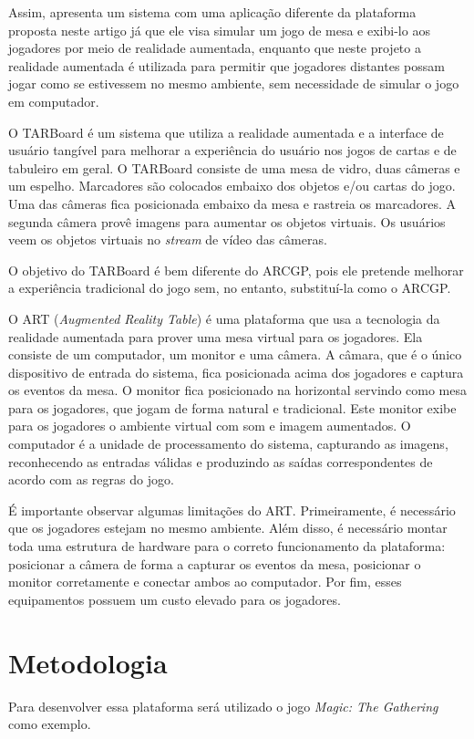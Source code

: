 \documentclass[conference]{IEEEtran}
\begin{document}
Assim, \cite{Szalavari:1998:CGA:293701.293740} apresenta um sistema com uma 
aplicação diferente da plataforma proposta neste artigo já que ele visa simular 
um jogo de mesa e exibi-lo aos jogadores por meio de realidade aumentada, 
enquanto que neste projeto a realidade aumentada é utilizada para permitir que 
jogadores distantes possam jogar como se estivessem no mesmo ambiente, sem 
necessidade de simular o jogo em computador.

O TARBoard \cite{lee2005tarboard} é um sistema que utiliza a realidade aumentada 
e a interface de usuário tangível para melhorar a experiência do usuário nos 
jogos de cartas e de tabuleiro em geral. O TARBoard consiste de uma mesa de 
vidro, duas câmeras e um espelho. Marcadores são colocados embaixo dos objetos 
e/ou cartas do jogo. Uma das câmeras fica posicionada embaixo da mesa e rastreia 
os marcadores. A segunda câmera provê imagens para aumentar os objetos virtuais. 
Os usuários veem os objetos virtuais no \textit{stream} de vídeo das câmeras.

O objetivo do TARBoard é bem diferente do ARCGP, pois ele pretende melhorar a 
experiência tradicional do jogo sem, no entanto, substituí-la como o ARCGP.

O ART (\textit{Augmented Reality Table}) \cite{Lam:2006:AAR:1128923.1128987} é 
uma plataforma que usa a tecnologia da realidade aumentada para prover uma mesa 
virtual para os jogadores. Ela consiste de um computador, um monitor e uma 
câmera. A câmara, que é o único dispositivo de entrada do sistema, fica 
posicionada acima dos jogadores e captura os eventos da mesa. O monitor fica 
posicionado na horizontal servindo como mesa para os jogadores, que jogam de 
forma natural e tradicional. Este monitor exibe para os jogadores o ambiente 
virtual com som e imagem aumentados. O computador é a unidade de processamento 
do sistema, capturando as imagens, reconhecendo as entradas válidas e produzindo 
as saídas correspondentes de acordo com as regras do jogo.

É importante observar algumas limitações do ART. Primeiramente, é necessário 
que os jogadores estejam no mesmo ambiente. Além disso, é necessário montar 
toda uma estrutura de hardware para o correto funcionamento da plataforma: 
posicionar a câmera de forma a capturar os eventos da mesa, posicionar o monitor 
corretamente e conectar ambos ao computador. Por fim, esses equipamentos 
possuem um custo elevado para os jogadores.

\section{Metodologia}
\label{metodologia}
Para desenvolver essa plataforma será utilizado o jogo \textit{Magic: The 
Gathering} como exemplo. 
\end{document}
